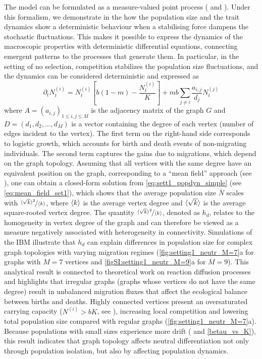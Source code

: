 The model can be formulated as a measure-valued point process (\citep{Bansaye2015} and ). Under this formalism, we demonstrate in the  how the population size and the trait dynamics show a deterministic behaviour when a stabilising force dampens the stochastic fluctuations. This makes it possible to express the dynamics of the macroscopic properties with deterministic differential equations, connecting emergent patterns to the processes that generate them. In particular, in the setting of no selection, competition stabilizes the population size fluctuations, and the dynamics can be considered deterministic and expressed as
%
\begin{equation}\label{eq:sett1_popdyn_simple}
  \partial_t N_t^{(i)} = N_t^{(i)} \left[ b(1-m) - \frac{N_t^{(i)}}{K} \right] + m b \sum_{j\neq i}\frac{a_{i,j}}{d_j} N_t^{(j)}
\end{equation}
%
where $A = (a_{i,j})_{1\leq i, j \leq M}$ is the adjacency matrix of the graph $G$ and $D = (d_1,d_2,\dots,d_M)$ is a vector containing the degree of each vertex (number of edges incident to the vertex).
%
The first term on the right-hand side corresponds to logistic growth, which accounts for birth and death events of non-migrating individuals. The second term captures the gains due to migrations, which depend on the graph topology. 
%
Assuming that all vertices with the same degree have an equivalent position on the graph, corresponding to a “mean field” approach (see ), one can obtain a closed-form solution from \cref{eq:sett1_popdyn_simple} (see \cref{eq:mean_field_set1}), which shows that the average population size $\bar{N}$ scales with $\nicefrac{\langle \sqrt{k} \rangle^2}{\langle k \rangle}$, where $\langle k \rangle$ is the average vertex degree and $\langle \sqrt{k} \rangle$ is the average square-rooted vertex degree. 
%
The quantity $\nicefrac{\langle \sqrt{k} \rangle^2}{\langle k \rangle}$, denoted as $h_d$, relates to the homogeneity in vertex degree of the graph and can therefore be viewed as a measure negatively associated with heterogeneity in connectivity. Simulations of the IBM illustrate that $h_d$ can explain differences in population size for complex graph topologies with varying migration regimes (\cref{fig:setting1_neutr_M=7}a for graphs with $M=7$ vertices and \cref{figSI:setting1_neutr_M=9}a for $M=9$). 
%
This analytical result is connected to theoretical work on reaction diffusion processes \citep{Colizza2007} and highlights that irregular graphs (graphs whose vertices do not have the same degree) result in unbalanced migration fluxes that affect the ecological balance between births and deaths. Highly connected vertices present an oversaturated carrying capacity ($N^{(i)} > bK$, see ), increasing local competition and lowering total population size compared with regular graphs (\cref{fig:setting1_neutr_M=7}a).
%
Because populations with small sizes experience more drift (\citep{Burger2000} and \cref{betau_vs_K}), this result indicates that graph topology affects neutral differentiation not only through population isolation, but also by affecting population dynamics.

